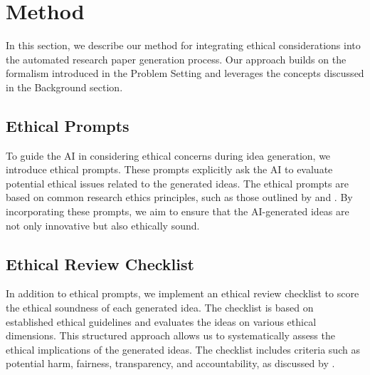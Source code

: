 \documentclass{article} %
\begin{document}
\section{Method}
\label{sec:method}

In this section, we describe our method for integrating ethical considerations into the automated research paper generation process. Our approach builds on the formalism introduced in the Problem Setting and leverages the concepts discussed in the Background section.

\subsection{Ethical Prompts}
To guide the AI in considering ethical concerns during idea generation, we introduce ethical prompts. These prompts explicitly ask the AI to evaluate potential ethical issues related to the generated ideas. The ethical prompts are based on common research ethics principles, such as those outlined by \citet{goodfellow2016deep} and \citet{yang2023diffusion}. By incorporating these prompts, we aim to ensure that the AI-generated ideas are not only innovative but also ethically sound.

\subsection{Ethical Review Checklist}
In addition to ethical prompts, we implement an ethical review checklist to score the ethical soundness of each generated idea. The checklist is based on established ethical guidelines and evaluates the ideas on various ethical dimensions. This structured approach allows us to systematically assess the ethical implications of the generated ideas. The checklist includes criteria such as potential harm, fairness, transparency, and accountability, as discussed by \citet{lu2024aiscientist}.
\end{document}
